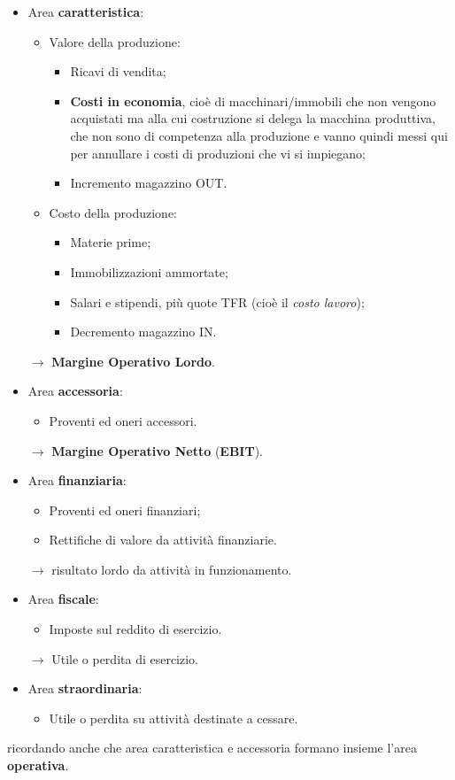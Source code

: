 \documentclass[a4paper,11pt]{article}
\begin{document}
\begin{itemize}
	\item Area \textbf{caratteristica}:
		\begin{itemize}
			\item Valore della produzione:
				\begin{itemize}
					\item Ricavi di vendita;
					\item \textbf{Costi in economia}, cioè di macchinari/immobili che non vengono acquistati ma alla cui costruzione si delega la macchina produttiva, che non sono di competenza alla produzione e vanno quindi messi qui per annullare i costi di produzioni che vi si impiegano;
					\item Incremento magazzino OUT.
				\end{itemize}
			\item Costo della produzione:
				\begin{itemize}
					\item Materie prime;
					\item Immobilizzazioni ammortate;
					\item Salari e stipendi, più quote TFR (cioè il \textit{costo lavoro});
					\item Decremento magazzino IN.
				\end{itemize}
		\end{itemize}
		$\rightarrow$ \textbf{Margine Operativo Lordo}.
	\item Area \textbf{accessoria}:
		\begin{itemize}
			\item Proventi ed oneri accessori.
		\end{itemize}
		$\rightarrow$ \textbf{Margine Operativo Netto} (\textbf{EBIT}).
	\item Area \textbf{finanziaria}:
		\begin{itemize}
			\item Proventi ed oneri finanziari;
			\item Rettifiche di valore da attività finanziarie.
		\end{itemize}
		$\rightarrow$ risultato lordo da attività in funzionamento.
	\item Area \textbf{fiscale}:
		\begin{itemize}
			\item Imposte sul reddito di esercizio.
		\end{itemize}
		$\rightarrow$ Utile o perdita di esercizio.
	\item Area \textbf{straordinaria}:
		\begin{itemize}
			\item Utile o perdita su attività destinate a cessare.
		\end{itemize}
\end{itemize}
ricordando anche che area caratteristica e accessoria formano insieme l'area \textbf{operativa}.
\end{document}
